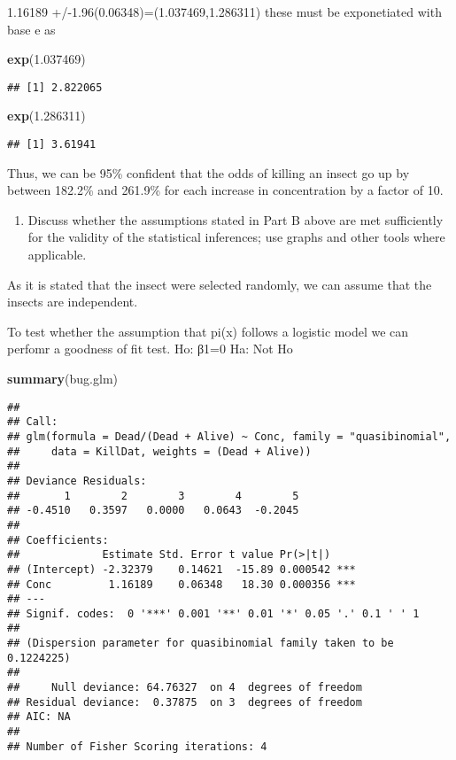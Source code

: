 \documentclass[]{article}
\newenvironment{Shaded}{\begin{snugshade}}{\end{snugshade}}
\newcommand{\KeywordTok}[1]{\textcolor[rgb]{0.13,0.29,0.53}{\textbf{#1}}}
\newcommand{\FloatTok}[1]{\textcolor[rgb]{0.00,0.00,0.81}{#1}}
\newcommand{\NormalTok}[1]{#1}
\providecommand{\tightlist}{%
  \setlength{\itemsep}{0pt}\setlength{\parskip}{0pt}}
\begin{document}
1.16189 +/-1.96(0.06348)=(1.037469,1.286311) these must be exponetiated
with base e as

\begin{Shaded}
\begin{Highlighting}[]
\KeywordTok{exp}\NormalTok{(}\FloatTok{1.037469}\NormalTok{)}
\end{Highlighting}
\end{Shaded}

\begin{verbatim}
## [1] 2.822065
\end{verbatim}

\begin{Shaded}
\begin{Highlighting}[]
\KeywordTok{exp}\NormalTok{(}\FloatTok{1.286311}\NormalTok{)}
\end{Highlighting}
\end{Shaded}

\begin{verbatim}
## [1] 3.61941
\end{verbatim}

Thus, we can be 95\% confident that the odds of killing an insect go up
by between 182.2\% and 261.9\% for each increase in concentration by a
factor of 10.

\begin{enumerate}
\def\labelenumi{\Alph{enumi})}
\setcounter{enumi}{3}
\tightlist
\item
  Discuss whether the assumptions stated in Part B above are met
  sufficiently for the validity of the statistical inferences; use
  graphs and other tools where applicable.
\end{enumerate}

As it is stated that the insect were selected randomly, we can assume
that the insects are independent.

To test whether the assumption that pi(x) follows a logistic model we
can perfomr a goodness of fit test. Ho: β1=0 Ha: Not Ho

\begin{Shaded}
\begin{Highlighting}[]
\KeywordTok{summary}\NormalTok{(bug.glm)}
\end{Highlighting}
\end{Shaded}

\begin{verbatim}
## 
## Call:
## glm(formula = Dead/(Dead + Alive) ~ Conc, family = "quasibinomial", 
##     data = KillDat, weights = (Dead + Alive))
## 
## Deviance Residuals: 
##       1        2        3        4        5  
## -0.4510   0.3597   0.0000   0.0643  -0.2045  
## 
## Coefficients:
##             Estimate Std. Error t value Pr(>|t|)    
## (Intercept) -2.32379    0.14621  -15.89 0.000542 ***
## Conc         1.16189    0.06348   18.30 0.000356 ***
## ---
## Signif. codes:  0 '***' 0.001 '**' 0.01 '*' 0.05 '.' 0.1 ' ' 1
## 
## (Dispersion parameter for quasibinomial family taken to be 0.1224225)
## 
##     Null deviance: 64.76327  on 4  degrees of freedom
## Residual deviance:  0.37875  on 3  degrees of freedom
## AIC: NA
## 
## Number of Fisher Scoring iterations: 4
\end{verbatim}
\end{document}

